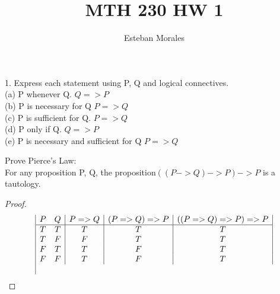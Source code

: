 \documentclass[12pt]{article}
\newenvironment{statement}[2][]{\begin{trivlist}
\item[\hskip \labelsep {\bfseries #1}\hskip \labelsep {\bfseries #2.}]}{\end{trivlist}}
\begin{document}
 
%
%
 
\title{MTH 230 HW 1} %
\author{Esteban Morales} %
\maketitle


\begin{statement}{Excercise 1} %
1. Express each statement using P, Q and logical connectives.
\\
(a) P whenever Q. $ Q => P $\\
(b) P is necessary for Q $ P => Q$\\
(c) P is sufficient for Q. $P => Q$\\
(d) P only if Q. $ Q => P$\\
(e) P is necessary and sufficient for Q $P => Q$\\


\end{statement}



\begin{statement}{Excercise 2}
Prove Pierce's Law: \\
For any proposition P, Q, the proposition$ ((P -> Q) -> P) -> P$ is a
tautology.
\begin{proof}

\begin{displaymath}
\begin{array}{|c c|c|c|c|}
P & Q & P=>Q& (P=>Q)=>P & ((P=>Q)=>P)=>P\\
\hline
T&T&T&T&T\\
T & F & F & T & T\\
F & T & T & F & T\\
F & F & T & F & T\\


\\



\end{array}
\end{displaymath}

\end{proof}

\end{statement}
\end{document}
